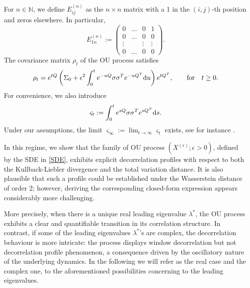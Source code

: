 \documentclass[12pt,thmsa]{article}
\begin{document}
For $n\in \mathbb{N}$, we define  $E^{(n)}_{ij}$ as the $n\times n$ matrix with a 1 in the $(i,j)$-th position and zeros elsewhere. In particular, 
\[
E^{(n)}_{1n}:=\begin{pmatrix} 0&\dots &0& 1\\0&\dots &0& 0\\
\vdots&  &\vdots& \vdots\\ 0&\dots& 0&0\end{pmatrix}.
\]
The covariance matrix $\rho_t$ of the OU process satisfies
\begin{equation}\label{covt}
\rho_t =e^{tQ}\left(\Sigma_0+\epsilon^2\int_0^{t}e^{-uQ}\sigma\sigma^T e^{-uQ^T}{\rm d}u\right)e^{tQ^T}
, \qquad\textrm{for}\quad t\ge 0.
\end{equation}
For convenience, we also introduce
\begin{equation}\label{vars}
\varsigma_t := \int_{0}^{t} 	e^{sQ} \sigma \sigma^T e^{ s Q^{T} } {\rm d}s .
\end{equation}
Under our assumptions,  the limit $ \varsigma_{\infty} := \lim_{ t \rightarrow \infty} \varsigma_t$ exists, see for instance \cite{KS91}.

In this regime, we show that the family of OU process $(X^{(\epsilon)}; \epsilon>0)$, defined by the SDE in \eqref{SDE}, exhibits explicit decorrelation profiles with respect to both the Kullback-Liebler divergence and the total variation distance. It is also plausible that such a profile could be established under the Wasserstein distance of order 2; however, deriving the corresponding closed-form expression 
appears considerably more challenging.


More precisely, when there is a unique real leading eigenvalue $\lambda^*$, the  OU process exhibits a clear and quantifiable transition in its correlation structure. In contrast, if some of the leading eigenvalues $\lambda^*$'s are complex, the decorrelation behaviour is more intricate: the process displays window decorrelation but not decorrelation profile phenomenon, a consequence driven by the oscillatory nature of the underlying dynamics. In the following we will refer as the real case and the complex one, to the aforementioned 
possibilities concerning to the leading eigenvalues.
\end{document}
